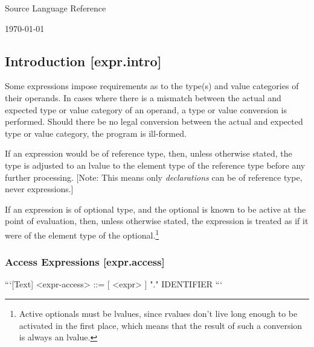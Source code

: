\documentclass[a4paper, 12pt, oneside, final]{article}
\makeatletter
\def\section{\@startsection{section}{1}{0mm}{-3.5ex}{3.5ex}{\normalfont\fontsize{24pt}{36pt}\selectfont}}
\makeatother
\begin{document}
\begingroup
    \parindent=0pt
    \centering
    \fontsize{36pt}{48pt}\selectfont Source Language Reference \par \bigskip\bigskip
    \Large \today \par
\endgroup

\tableofcontents
\clearpage

\section{Expressions [expr]}
\subsection{Introduction [expr.intro]}
Some expressions impose requirements as to the type(s) and value categories of their
operands. In cases where there is a mismatch between the actual and expected type or
value category of an operand, a type or value conversion is performed. Should there
be no legal conversion between the actual and expected type or value category, the
program is ill-formed.

If an expression would be of reference type, then, unless otherwise stated, the type is adjusted to
an lvalue to the element type of the reference type before any further processing.
[Note: This means only \textit{declarations} can be of reference type, never expressions.]

If an expression is of optional type, and the optional is known to be active at the point
of evaluation, then, unless otherwise stated, the expression is treated as if it were of
the element type of the optional.\footnote{Active optionals must be lvalues, since rvalues
don’t live long enough to be activated in the first place, which means that the result of
such a conversion is always an lvalue.}

\subsubsection{Access Expressions [expr.access]}
```[Text]
<expr-access> ::= [ <expr> ] "." IDENTIFIER
```
\end{document}
